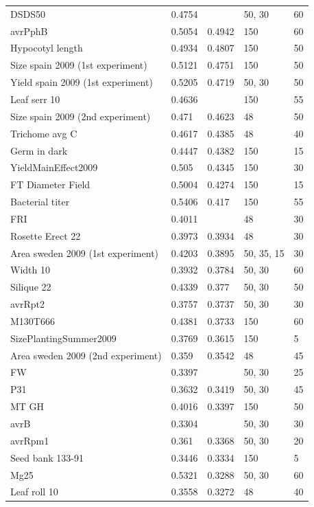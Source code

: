 \begin{longtable}{p{} p{} p{} p{} p{}}
  DSDS50 & 0.4754 & \color{red}{0.5006} & 50, 30 & 60 \\
  avrPphB & 0.5054 & 0.4942 & 150 & 60 \\
  Hypocotyl length & 0.4934 & 0.4807 & 150 & 50 \\
  Size spain 2009 (1st experiment) & 0.5121 & 0.4751 & 150 & 50 \\
  Yield spain 2009 (1st experiment) & 0.5205 & 0.4719 & 50, 30 & 50 \\
  Leaf serr 10 & 0.4636 & \color{red}{0.4683} & 150 & 55 \\
  Size spain 2009 (2nd experiment) & 0.471 & 0.4623 & 48 & 50 \\
  Trichome avg C & 0.4617 & 0.4385 & 48 & 40 \\
  Germ in dark & 0.4447 & 0.4382 & 150 & 15 \\
  YieldMainEffect2009 & 0.505 & 0.4345 & 150 & 30 \\
  FT Diameter Field & 0.5004 & 0.4274 & 150 & 15 \\
  Bacterial titer & 0.5406 & 0.417 & 150 & 55 \\
  FRI & 0.4011 & \color{red}{0.4119} & 48 & 30 \\
  Rosette Erect 22 & 0.3973 & 0.3934 & 48 & 30 \\
  Area sweden 2009 (1st experiment) & 0.4203 & 0.3895 & 50, 35, 15 & 30 \\
  Width 10 & 0.3932 & 0.3784 & 50, 30 & 60 \\
  Silique 22 & 0.4339 & 0.377 & 50, 30 & 50 \\
  avrRpt2 & 0.3757 & 0.3737 & 50, 30 & 30 \\
  M130T666 & 0.4381 & 0.3733 & 150 & 60 \\
  SizePlantingSummer2009 & 0.3769 & 0.3615 & 150 & 5 \\
  Area sweden 2009 (2nd experiment) & 0.359 & 0.3542 & 48 & 45 \\
  FW  & 0.3397 & \color{red}{0.3522} & 50, 30 & 25 \\
  P31 & 0.3632 & 0.3419 & 50, 30 & 45 \\
  MT GH & 0.4016 & 0.3397 & 150 & 50 \\
  avrB & 0.3304 & \color{red}{0.3384} & 50, 30 & 30 \\
  avrRpm1 & 0.361 & 0.3368 & 50, 30 & 20 \\
  Seed bank 133-91 & 0.3446 & 0.3334 & 150 & 5 \\
  Mg25 & 0.5321 & 0.3288 & 50, 30 & 60 \\
  Leaf roll 10 & 0.3558 & 0.3272 & 48 & 40 \\

\end{longtable}
